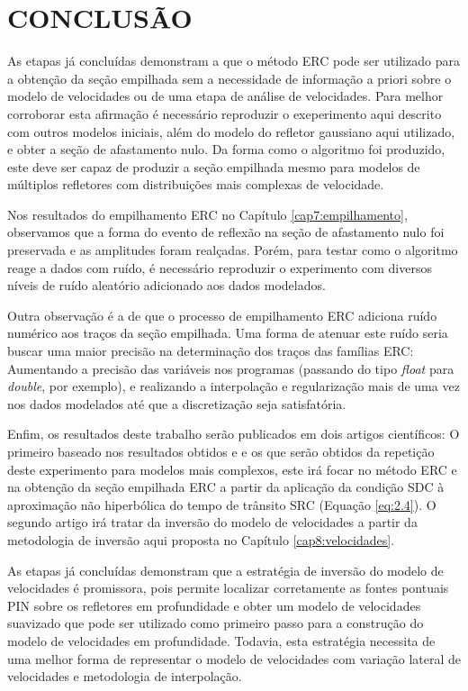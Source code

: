 \chapter{CONCLUSÃO}
\label{cap10:conclusao}

As etapas já concluídas demonstram a que o método ERC pode ser utilizado para a obtenção da seção empilhada sem a necessidade
de informação a priori sobre o modelo de velocidades ou de uma etapa de análise de velocidades. Para melhor corroborar esta 
afirmação é necessário reproduzir o exeperimento aqui descrito com outros modelos iniciais, além do modelo do refletor gaussiano
aqui utilizado, e obter a seção de afastamento nulo.
Da forma como o algoritmo foi produzido, este deve ser capaz de produzir a seção empilhada mesmo para modelos de múltiplos refletores
com distribuições mais complexas de velocidade.

Nos resultados do empilhamento ERC no Capítulo \ref{cap7:empilhamento}, observamos que a forma do evento de reflexão na seção
de afastamento nulo foi preservada e as amplitudes foram realçadas. Porém, para testar como o algoritmo reage
a dados com ruído, é necessário reproduzir o experimento com diversos níveis de ruído aleatório adicionado aos dados modelados.

Outra observação é a de que o processo de empilhamento ERC adiciona ruído numérico aos traços da seção empilhada. Uma forma de
atenuar este ruído seria buscar uma maior precisão na determinação dos traços das famílias ERC: Aumentando a precisão das variáveis
nos programas (passando do tipo \textit{float} para \textit{double}, por exemplo), e realizando a interpolação e regularização
mais de uma vez nos dados modelados até que a discretização seja satisfatória.

Enfim, os resultados deste trabalho serão publicados em dois artigos científicos: O primeiro baseado 
nos resultados obtidos e e os que 
serão obtidos da repetição deste experimento para modelos mais complexos, este irá focar no método ERC e na obtenção da seção
empilhada ERC a partir da aplicação da condição SDC à aproximação não hiperbólica do tempo de trânsito SRC (Equação \ref{eq:2.4}).
O segundo artigo irá tratar da inversão do modelo de velocidades a partir da metodologia de inversão aqui proposta
no Capítulo \ref{cap8:velocidades}.

As etapas já concluídas demonstram que a estratégia de inversão do modelo de velocidades é promissora,
pois permite localizar corretamente as fontes pontuais PIN sobre os refletores em profundidade
e obter um modelo de velocidades suavizado que pode ser utilizado como primeiro passo
para a construção do modelo de velocidades em profundidade. Todavia,
esta estratégia necessita de uma melhor forma de representar o modelo de velocidades com variação lateral
de velocidades e metodologia de interpolação.


